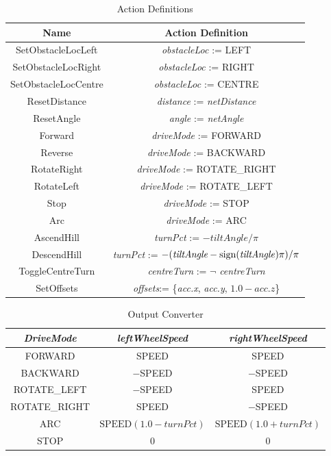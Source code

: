 \documentclass[11pt]{article}
\begin{document}
\begin{table}[p]
    \centering
    \begin{tabular}{|c|c|}
        \hline
        Name        & Action Definition \\
        \hline\hline
        SetObstacleLocLeft & \textit{obstacleLoc} := LEFT \\
        \hline
        SetObstacleLocRight & \textit{obstacleLoc} := RIGHT \\
        \hline
        SetObstacleLocCentre & \textit{obstacleLoc} := CENTRE \\
        \hline
        ResetDistance & \textit{distance} := \textit{netDistance}\\
        \hline
        ResetAngle & \textit{angle} := \textit{netAngle}\\
        \hline
        Forward & \textit{driveMode} := FORWARD \\
        \hline
        Reverse & \textit{driveMode} := BACKWARD \\
        \hline
        RotateRight & \textit{driveMode} := ROTATE\_RIGHT \\
        \hline
        RotateLeft & \textit{driveMode} := ROTATE\_LEFT \\
        \hline
        Stop & \textit{driveMode} := STOP \\
        \hline
        Arc & \textit{driveMode} := ARC \\
        \hline
        AscendHill & \textit{turnPct} := $-\textit{tiltAngle}/\pi$\\
        \hline
        DescendHill & \textit{turnPct} := $-(\textit{tiltAngle}-\text{sign(\textit{tiltAngle})}\pi)/\pi$\\
        \hline
        ToggleCentreTurn & \textit{centreTurn} := $\neg$ \textit{centreTurn}\\
        \hline
        SetOffsets & \textit{offsets}:= \{\textit{acc.x}, \textit{acc.y}, $1.0-\textit{acc.z}$\}\\
        \hline
    \end{tabular}
    \caption{Action Definitions}
    \label{tab:actions}
\end{table}

\begin{table}[p]
    \centering
    \begin{tabular}{|c|c|c|}
        \hline
        \textit{DriveMode}  & \textit{leftWheelSpeed} & \textit{rightWheelSpeed} \\
        \hline\hline
        FORWARD & SPEED & SPEED \\
        \hline
        BACKWARD & $-$SPEED & $-$SPEED \\
        \hline
        ROTATE\_LEFT & $-$SPEED & SPEED \\
        \hline
        ROTATE\_RIGHT & SPEED & $-$SPEED \\
        \hline
        ARC & $\text{SPEED}(1.0-\textit{turnPct})$ & $\text{SPEED}(1.0+\textit{turnPct})$ \\
        \hline
        STOP & 0 & 0\\
        \hline
    \end{tabular}
    \caption{Output Converter}
    \label{tab:outputs}
\end{table}
\end{document}
